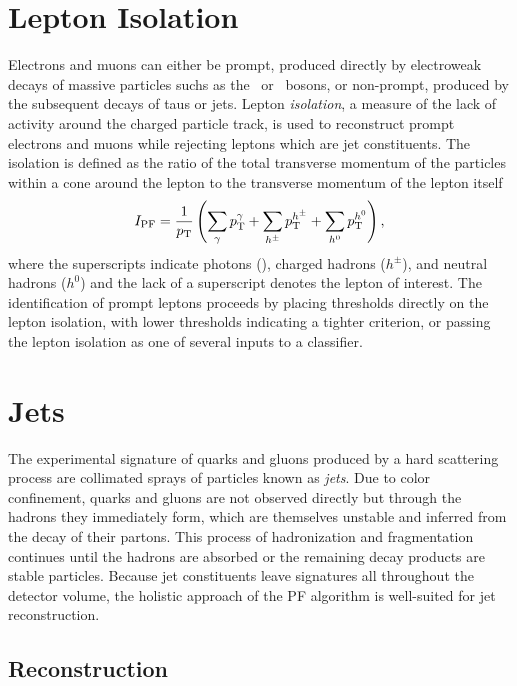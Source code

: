 \section{Lepton Isolation}

Electrons and muons can either be prompt, produced directly by electroweak decays of massive particles suchs as the \bosW\ or \bosZ\ bosons, or non-prompt, produced by the subsequent decays of taus or jets. Lepton \textit{isolation}, a measure of the lack of activity around the charged particle track, is used to reconstruct prompt electrons and muons while rejecting leptons which are jet constituents. The isolation is defined as the ratio of the total transverse momentum of the particles within a cone around the lepton to the transverse momentum of the lepton itself
\begin{equation}
  I_{\mathrm{PF}} = \frac{1}{\pT} \left( \sum_{\bosg}\pT^{\bosg} + \sum_{h^{\pm}}\pT^{h^{\pm}} + \sum_{h^{0}}\pT^{h^{0}} \right),
  \label{eq:iso}
\end{equation}
where the superscripts indicate photons (\bosg), charged hadrons ($h^{\pm}$), and neutral hadrons ($h^{0}$) and the lack of a superscript denotes the lepton of interest. The identification of prompt leptons proceeds by placing thresholds directly on the lepton isolation, with lower thresholds indicating a tighter criterion, or passing the lepton isolation as one of several inputs to a classifier.

\section{Jets}\label{jetreco}

The experimental signature of quarks and gluons produced by a hard scattering process are collimated sprays of particles known as \textit{jets}. Due to color confinement, quarks and gluons are not observed directly but through the hadrons they immediately form, which are themselves unstable and inferred from the decay of their partons. This process of hadronization and fragmentation continues until the hadrons are absorbed or the remaining decay products are stable particles. Because jet constituents leave signatures all throughout the detector volume, the holistic approach of the PF algorithm is well-suited for jet reconstruction.

\subsection{Reconstruction}

